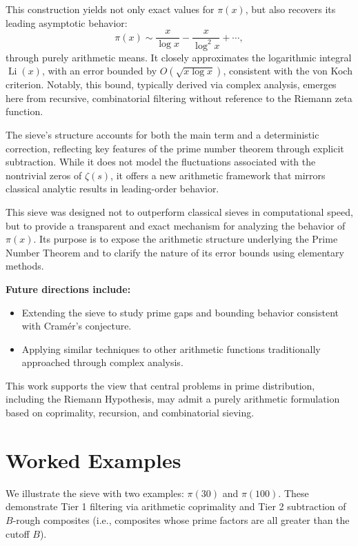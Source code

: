 \documentclass[11pt]{article}
\begin{document}
	This construction yields not only exact values for \( \pi(x) \), but also recovers its leading asymptotic behavior:
	\[
	\pi(x) \sim \frac{x}{\log x} - \frac{x}{\log^2 x} + \cdots,
	\]
	through purely arithmetic means. It closely approximates the logarithmic integral \( \operatorname{Li}(x) \), with an error bounded by \( O(\sqrt{x \log x}) \), consistent with the von Koch criterion. Notably, this bound, typically derived via complex analysis, emerges here from recursive, combinatorial filtering without reference to the Riemann zeta function.
	
	The sieve's structure accounts for both the main term and a deterministic correction, reflecting key features of the prime number theorem through explicit subtraction. While it does not model the fluctuations associated with the nontrivial zeros of \( \zeta(s) \), it offers a new arithmetic framework that mirrors classical analytic results in leading-order behavior.
	
	This sieve was designed not to outperform classical sieves in computational speed, but to provide a transparent and exact mechanism for analyzing the behavior of \( \pi(x) \). Its purpose is to expose the arithmetic structure underlying the Prime Number Theorem and to clarify the nature of its error bounds using elementary methods.
	
	\medskip
	
	\textbf{Future directions include:}
	\begin{itemize}
		\item Extending the sieve to study prime gaps and bounding behavior consistent with Cramér's conjecture.
		\item Applying similar techniques to other arithmetic functions traditionally approached through complex analysis.
	\end{itemize}
	
	\medskip
	
	This work supports the view that central problems in prime distribution, including the Riemann Hypothesis, may admit a purely arithmetic formulation based on coprimality, recursion, and combinatorial sieving.



	
	
	\appendix
	\section{Worked Examples}
	
	We illustrate the sieve with two examples: \( \pi(30) \) and \( \pi(100) \). These demonstrate Tier 1 filtering via arithmetic coprimality and Tier 2 subtraction of \( B \)-rough composites (i.e., composites whose prime factors are all greater than the cutoff \( B \)).
	
\end{document}
